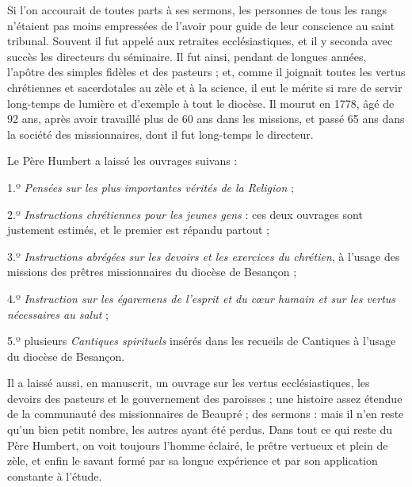 \documentclass[instructions.tex]{subfiles}
\begin{document}
Si l’on accourait de toutes parts à ses sermons, les personnes de tous les rangs n’étaient pas moins empressées de l’avoir pour guide de leur conscience au saint tribunal. Souvent il fut appelé aux retraites ecclésiastiques, et il y seconda avec succès les directeurs du séminaire. Il fut ainsi, pendant de longues années, l’apôtre des simples fidèles et des pasteurs ; et, comme il joignait toutes les vertus chrétiennes et sacerdotales au zèle et à la science, il eut le mérite si rare de servir long-temps de lumière et d’exemple à tout le diocèse. Il mourut en 1778, âgé de 92 ans, après avoir travaillé plus de 60 ans dans les missions, et passé 65 ans dans la société des missionnaires, dont il fut long-temps le directeur.

Le Père Humbert a laissé les ouvrages suivans :

1.º \textit{Pensées sur les plus importantes vérités de la Religion} ;

2.º \textit{Instructions chrétiennes pour les jeunes gens} : ces deux ouvrages sont justement estimés, et le premier est répandu partout ;

3.º \textit{Instructions abrégées sur les devoirs et les exercices du chrétien}, à l’usage des missions des prêtres missionnaires du diocèse de Besançon ;

4.º \textit{Instruction sur les égaremens de l’esprit et du cœur humain et sur les vertus nécessaires au salut} ;

5.º plusieurs \textit{Cantiques spirituels} insérés dans les recueils de Cantiques à l’usage du diocèse de Besançon.

Il a laissé aussi, en manuscrit, un ouvrage sur les vertus ecclésiastiques, les devoirs des pasteurs et le gouvernement des paroisses ; une histoire assez étendue de la communauté des missionnaires de Beaupré ; des sermons : mais il n’en reste qu’un bien petit nombre, les autres ayant été perdus. Dans tout ce qui reste du Père Humbert, on voit toujours l’homme éclairé, le prêtre vertueux et plein de zèle, et enfin le savant formé par sa longue expérience et par son application constante à l’étude.
\end{document}
